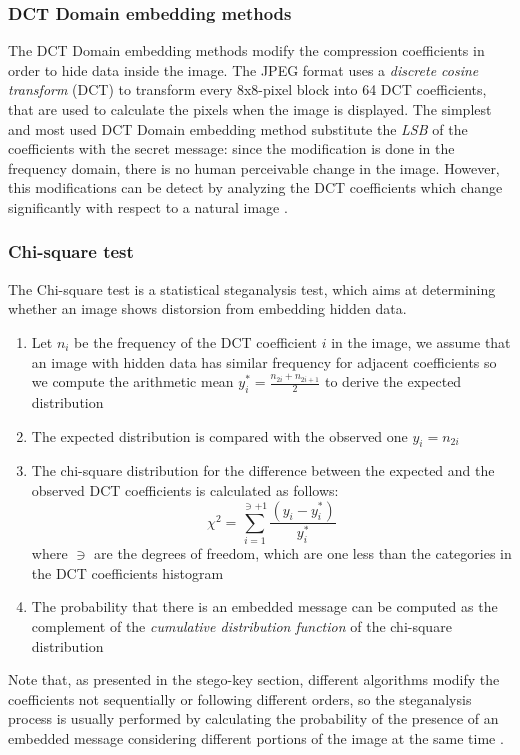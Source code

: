 \documentclass[../../main.tex]{subfiles}
\begin{document}
\subsubsection{DCT Domain embedding methods}
The DCT Domain embedding methods modify the compression coefficients
in order to hide data inside the image.
The JPEG format uses a \emph{discrete cosine transform} (DCT) to transform
every 8x8-pixel block into 64 DCT coefficients, that are used to calculate
the pixels when the image is displayed.
The simplest and most used DCT Domain embedding method substitute the
\emph{LSB} of the coefficients with the secret message: since the
modification is done in the frequency domain, there is no human perceivable
change in the image.
However, this modifications can be detect by analyzing the DCT coefficients
which change significantly with respect to a natural image
\cite{jpeg-image-internet}.
\subsubsection{Chi-square test}
The Chi-square test is a statistical steganalysis test, which aims
at determining whether an image shows distorsion from embedding hidden data.
\begin{enumerate}
    \item Let $n_i$ be the frequency of the DCT coefficient $i$ in the
        image, we assume that an image with hidden data has similar
        frequency for adjacent coefficients so we compute the arithmetic
        mean $y_{i}^{*} = \frac{n_{2i}+n_{2i+1}}{2}$ to derive the expected
        distribution
    \item The expected distribution is compared with the observed one
        $y_i = n_{2i}$
    \item The chi-square distribution for the difference between the
        expected and the observed DCT coefficients is calculated as follows:
        $$ \chi^2 = \sum_{i=1}^{\ni+1}
        \frac{\left( y_i-y_{i}^{*}\right)}{y_{i}^{*}}$$
        where $\ni$ are the degrees of freedom, which are one less than the
        categories in the DCT coefficients histogram
    \item The probability that there is an embedded message can be computed
        as the complement of the \emph{cumulative distribution function} of
        the chi-square distribution
\end{enumerate}
Note that, as presented in the stego-key section, different algorithms
modify the coefficients not sequentially or following different orders, so
the steganalysis process is usually performed by calculating the probability
of the presence of an embedded message considering different portions of the
image at the same time \cite{jpeg-image-internet}.
\end{document}
